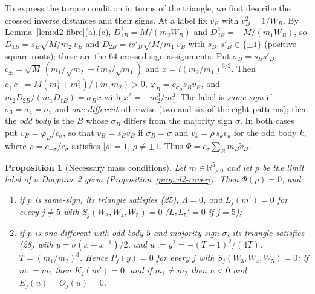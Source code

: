 \documentclass[11pt]{amsart}
\newenvironment{alphalist}{\begin{enumerate}\renewcommand{\labelenumi}{(\alph{enumi})}%
  \renewcommand{\theenumi}{\alph{enumi}}}{\end{enumerate}}
\newtheorem{proposition}[theorem]{Proposition}
\theoremstyle{definition}
\theoremstyle{remark}
\newcommand{\Rp}{\mathbb{R}_{>0}}
\begin{document}
{To express the torque condition in terms of the triangle, we first describe
the crossed inverse distances and their signs.}  At a label fix $v_B$ with $v_B^2=1/W_B$.  By Lemma~\ref{lem:d2-fibre}(a),(c),
$D_{1B}^2=M/(m_2W_B)$ and $D_{2B}^2=-M/(m_1W_B)$, so $D_{1B}=s_B\sqrt{M/m_2}\,v_B$ and
$D_{2B}=is'_B\sqrt{M/m_1}\,v_B$ with $s_B,s'_B\in\{\pm1\}$ (positive square roots); these are the
$64$ crossed-sign assignments.  Put $\sigma_B=s_Bs'_B$,
$c_\pm=\sqrt M\,(m_1/\sqrt{m_2}\pm i\,m_2/\sqrt{m_1})$ and $x=i(m_2/m_1)^{3/2}$.  Then
$c_+c_-=M(m_1^3+m_2^3)/(m_1m_2)>0$, $\varphi_B=c_{\sigma_B}s_Bv_B$, and
$m_2D_{2B}/(m_1D_{1B})=\sigma_Bx$ with $x^2=-m_2^3/m_1^3$.  The label is \emph{same-sign} if
$\sigma_3=\sigma_4=\sigma_5$ and \emph{one-different} otherwise (two and six of the eight
patterns); then the \emph{odd body} is the $B$ whose $\sigma_B$ differs from the majority sign
$\sigma$.  In both cases put $\tilde v_B=\varphi_B/c_\sigma$, so that $\tilde v_B=s_Bv_B$ if
$\sigma_B=\sigma$ and $\tilde v_k=\rho\,s_kv_k$ for the odd body $k$, where
$\rho=c_{-\sigma}/c_\sigma$ satisfies $|\rho|=1$, $\rho\ne\pm1$.  Thus
$\Phi=c_\sigma\sum_Bm_B\tilde v_B$.
\begin{proposition}[Necessary mass conditions]\label{prop:d2-first}
Let $m\in\Rp^5$ and let $p$ be the limit label of a Diagram~2 germ
\textup{(}Proposition~\ref{prop:d2-cover}\textup{)}.  Then $\Phi(p)=0$, and:
\begin{alphalist}
  \item if $p$ is same-sign, its triangle satisfies \textup{(25)}, $\Lambda=0$, and
  $L_j(m')=0$ for every $j\ne5$ with $S_j(W_3,W_4,W_5)=0$ \textup{(}$L_5L_5'=0$ if $j=5$\textup{)};
  \item if $p$ is one-different with odd body $5$ and majority sign $\sigma$, its triangle satisfies
  \textup{(28)} with $y=\sigma(x+x^{-1})/2$, and $u:=y^2=-(T-1)^2/(4T)$, $T=(m_1/m_2)^3$.  Hence
  $P_j(y)=0$ for every $j$ with $S_j(W_3,W_4,W_5)=0$: if $m_1=m_2$ then $K_j(m')=0$, and if
  $m_1\ne m_2$ then $u<0$ and $E_j(u)=O_j(u)=0$.
\end{alphalist}
\end{proposition}
\end{document}

